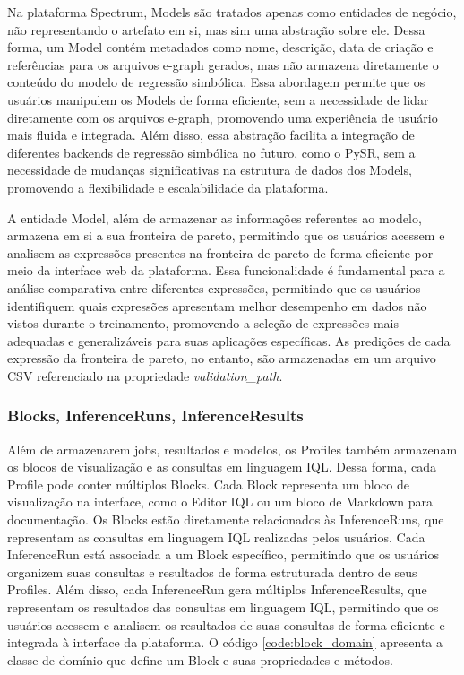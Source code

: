 Na plataforma Spectrum, Models são tratados apenas como entidades de negócio, não representando o artefato em si, mas sim uma abstração sobre ele. Dessa forma, um Model contém metadados como nome, descrição, data de criação e referências para os arquivos e-graph gerados, mas não armazena diretamente o conteúdo do modelo de regressão simbólica. Essa abordagem permite que os usuários manipulem os Models de forma eficiente, sem a necessidade de lidar diretamente com os arquivos e-graph, promovendo uma experiência de usuário mais fluida e integrada. Além disso, essa abstração facilita a integração de diferentes backends de regressão simbólica no futuro, como o PySR, sem a necessidade de mudanças significativas na estrutura de dados dos Models, promovendo a flexibilidade e escalabilidade da plataforma.

A entidade Model, além de armazenar as informações referentes ao modelo, armazena em si a sua fronteira de pareto, permitindo que os usuários acessem e analisem as expressões presentes na fronteira de pareto de forma eficiente por meio da interface web da plataforma. Essa funcionalidade é fundamental para a análise comparativa entre diferentes expressões, permitindo que os usuários identifiquem quais expressões apresentam melhor desempenho em dados não vistos durante o treinamento, promovendo a seleção de expressões mais adequadas e generalizáveis para suas aplicações específicas. As predições de cada expressão da fronteira de pareto, no entanto, são armazenadas em um arquivo CSV referenciado na propriedade \textit{validation\_path}.

\subsubsection{Blocks, InferenceRuns, InferenceResults}
Além de armazenarem jobs, resultados e modelos, os Profiles também armazenam os blocos de visualização e as consultas em linguagem IQL. Dessa forma, cada Profile pode conter múltiplos Blocks. Cada Block representa um bloco de visualização na interface, como o Editor IQL ou um bloco de Markdown para documentação. Os Blocks estão diretamente relacionados às InferenceRuns, que representam as consultas em linguagem IQL realizadas pelos usuários. Cada InferenceRun está associada a um Block específico, permitindo que os usuários organizem suas consultas e resultados de forma estruturada dentro de seus Profiles. Além disso, cada InferenceRun gera múltiplos InferenceResults, que representam os resultados das consultas em linguagem IQL, permitindo que os usuários acessem e analisem os resultados de suas consultas de forma eficiente e integrada à interface da plataforma. O código \ref{code:block_domain} apresenta a classe de domínio que define um Block e suas propriedades e métodos.

